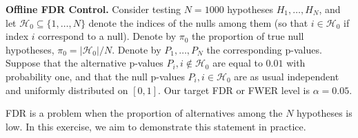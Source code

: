 \documentclass[12pt, addpoints]{exam}
\theoremstyle{plain}
\begin{document}
\begin{questions}



    \question[20] \textbf{Offline FDR Control.} Consider testing $N=1000$ hypotheses $H_1,\dots, H_N$, and let $\mathcal{H}_0\subseteq\{1,\dots,N\}$ denote the indices of the nulls among them (so that $i \in \mathcal{H}_0$ if index $i$ correspond to a null). Denote by $\pi_0$ the proportion of true null hypotheses, $\pi_0 = |\mathcal{H}_0|/N$. Denote by $P_1,\dots,P_N$ the corresponding p-values. Suppose that the alternative p-values $P_i, i\not\in \mathcal{H}_0$ are equal to $0.01$ with probability one, and that the null p-values $P_i, i\in \mathcal{H}_0$ are as usual independent and uniformly distributed on $[0,1]$. Our target FDR or FWER level is $\alpha = 0.05$.
    
    FDR is a problem when the proportion of alternatives among the $N$ hypotheses is low. In this exercise, we aim to demonstrate this statement in practice.
    

\end{questions}
\end{document}

